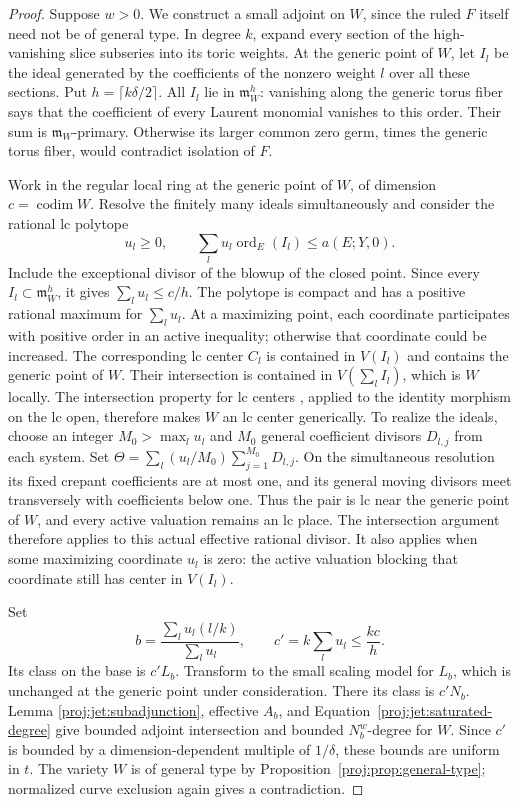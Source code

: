 \documentclass[11pt,letterpaper]{article}
\DeclareMathOperator{\codim}{codim}
\DeclareMathOperator{\ord}{ord}
\theoremstyle{definition}
\theoremstyle{remark}
\begin{document}
\begin{proof}
Suppose \(w>0\).  We construct a small adjoint on \(W\), since the
ruled \(F\) itself need not be of general type.  In degree \(k\),
expand every section of the high-vanishing slice subseries into
its toric weights.  At the generic point of \(W\), let \(I_l\) be
the ideal generated by the coefficients of the nonzero weight \(l\)
over all these sections.  Put \(h=\lceil k\delta/2\rceil\).
All \(I_l\) lie in \(\mathfrak m_W^h\): vanishing along the generic
torus fiber says that the coefficient of every Laurent monomial
vanishes to this order.  Their sum is
\(\mathfrak m_W\)-primary.  Otherwise its larger common zero germ,
times the generic torus fiber, would contradict isolation of \(F\).

Work in the regular local ring at the generic point of \(W\), of
dimension \(c=\codim W\).  Resolve the finitely many ideals
simultaneously and consider the rational lc polytope
\[
 u_l\ge0,\qquad
 \sum_lu_l\ord_E(I_l)\le a(E;Y,0).
\]
Include the exceptional divisor of the blowup of the closed point.
Since every \(I_l\subset\mathfrak m_W^h\), it gives
\(\sum_lu_l\le c/h\).  The polytope is compact and has a positive
rational maximum for \(\sum_lu_l\).  At a maximizing point, each
coordinate participates with positive order in an active
inequality; otherwise that coordinate could be increased.
The corresponding lc center \(C_l\) is contained in \(V(I_l)\)
and contains the generic point of \(W\).  Their intersection is
contained in \(V(\sum_l I_l)\), which is \(W\) locally.  The
intersection property for lc centers
\cite[Theorem~1.7]{Proj-KollarKovacs2010}, applied to the identity
morphism on the lc open, therefore makes \(W\) an lc center
generically.  To realize the ideals, choose an integer
\(M_0>\max_l u_l\) and \(M_0\) general coefficient divisors
\(D_{l,j}\) from each system.  Set
\(\Theta=\sum_l(u_l/M_0)\sum_{j=1}^{M_0}D_{l,j}\).
On the simultaneous resolution its fixed crepant coefficients are
at most one, and its general moving divisors meet transversely
with coefficients below one.  Thus the pair is lc near the generic
point of \(W\), and every active valuation remains an lc place.
The intersection argument therefore applies to this actual
effective rational divisor.  It also applies when some maximizing
coordinate \(u_l\) is zero: the active valuation blocking that
coordinate still has center in \(V(I_l)\).

Set
\[
 b=\frac{\sum_lu_l(l/k)}{\sum_lu_l},
 \qquad c'=k\sum_lu_l\le\frac{kc}{h}.
\]
Its class on the base is \(c'L_b\).  Transform to the small scaling
model for \(L_b\), which is unchanged at the generic point under
consideration.  There its class is \(c'N_b\).  Lemma
\ref{proj:jet:subadjunction}, effective \(A_b\), and
Equation~\eqref{proj:jet:saturated-degree} give bounded adjoint
intersection and bounded \(N_b^w\)-degree for \(W\).
Since \(c'\) is bounded by a dimension-dependent multiple of
\(1/\delta\), these bounds are uniform in \(t\).
The variety \(W\) is of general type by
Proposition~\ref{proj:prop:general-type}; normalized curve exclusion
again gives a contradiction.


\end{proof}
\end{document}
